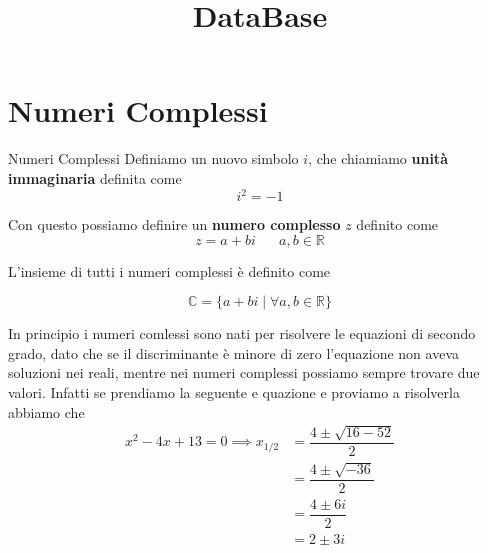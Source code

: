 \documentclass{rapport}
\title{DataBase} %
\begin{document}

\subject{Algebra Lineare} %


        
\buildmargins %
\buildcover %
\toc %




\section{Numeri Complessi}
\begin{definizione}{Numeri Complessi}{}
  Definiamo un nuovo simbolo $i$, che chiamiamo \textbf{unità immaginaria} definita come
  \[
  i^2 = -1
  \]

  Con questo possiamo definire un \textbf{numero complesso} $z$ definito come
  \[
  z = a+bi \;\;\;\;\;\; a,b \in \mathbb{R}
  \]

  L'insieme di tutti i numeri complessi è  definito come

  \[
  \mathbb{C} = \{a+bi \; | \; \forall a,b \in \mathbb{R}\}
  \]
\end{definizione}
 In principio i numeri comlessi sono nati per risolvere le equazioni di secondo grado, dato che se il discriminante è minore di zero l'equazione non aveva soluzioni nei reali, mentre nei numeri complessi possiamo sempre trovare due valori. Infatti se prendiamo la seguente e quazione e proviamo a risolverla abbiamo che 
 \begin{align*}
   x^2-4x+13 = 0 \implies x_{1/2} &= \dfrac{4 \pm \sqrt{16 - 52}}{2} \\
   &= \dfrac{4 \pm \sqrt{-36}}{2} \\
   &= \dfrac{4 \pm 6i}{2} \\
   &= 2 \pm 3i
 \end{align*}
\end{document}
